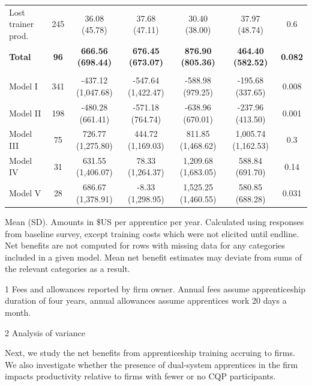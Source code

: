 \documentclass[
  11pt,
a4paper
]{article}
\begin{document}
\begin{table}[H]
{\begin{threeparttable}
\begin{tabular}[t]{lcccccc}
\hspace{1em}Lost trainer prod. & 245 & 36.08 (45.78) & 37.68 (47.11) & 30.40 (38.00) & 37.97 (48.74) & 0.6\\
\textbf{\hspace{1em}Total} & \textbf{96} & \textbf{666.56 (698.44)} & \textbf{676.45 (673.07)} & \textbf{876.90 (805.36)} & \textbf{464.40 (582.52)} & \textbf{0.082}\\
\addlinespace[0.3em]
\multicolumn{7}{l}{\textbf{Net Benefits}}\\
\hspace{1em}Model I & 341 & -437.12 (1,047.68) & -547.64 (1,422.47) & -588.98 (979.25) & -195.68 (337.65) & 0.008\\
\hspace{1em}Model II & 198 & -480.28 (661.41) & -571.18 (764.74) & -638.96 (670.01) & -237.96 (413.50) & 0.001\\
\hspace{1em}Model III & 75 & 726.77 (1,275.80) & 444.72 (1,169.03) & 811.85 (1,468.62) & 1,005.74 (1,162.53) & 0.3\\
\hspace{1em}Model IV & 31 & 631.55 (1,406.07) & 78.33 (1,264.37) & 1,209.68 (1,683.05) & 588.84 (691.70) & 0.14\\
\hspace{1em}Model V & 28 & 686.67 (1,378.91) & -8.33 (1,298.95) & 1,525.25 (1,460.55) & 580.85 (688.28) & 0.031\\
\bottomrule
\end{tabular}
\begin{tablenotes}
\small
\item Mean (SD). Amounts in \$US per apprentice per year. Calculated using responses from baseline survey, except training costs which were not elicited until endline. Net benefits are not computed for rows with missing data for any categories included in a given model. Mean net benefit estimates may deviate from sums of the relevant categories as a result.
\item[1] Fees and allowances reported by firm owner. Annual fees assume apprenticeship duration of four years, annual allowances assume apprentices work 20 days a month.
\item[2] Analysis of variance
\end{tablenotes}
\end{threeparttable}}
\end{table}

\noindent Next, we study the net benefits from apprenticeship training accruing to firms. We also investigate whether the presence of dual-system apprentices in the firm impacts productivity relative to firms with fewer or no CQP participants.
\end{document}
